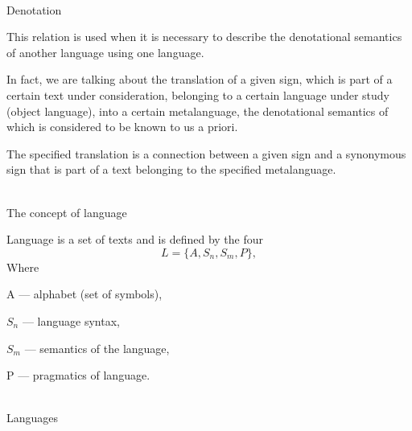 \begin{frame}{\\Denotation}
	\topline
	\justifying
	\small
	
	This relation is used when it is necessary to describe the denotational semantics of another language using one language.
	
	\bigskip
	
	In fact, we are talking about the translation of a given sign, which is part of a certain text under consideration, belonging to a certain language under study (object language), into a certain metalanguage, the denotational semantics of which is considered to be known to us a priori.
	
	\bigskip
	
	The specified translation is a connection between a given sign and a synonymous sign that is part of a text belonging to the specified metalanguage.
	
\end{frame}

\begin{frame}{\\The concept of language}
	\topline
	\justifying
	
	Language is a set of texts and is defined by the four
	\[
	L = \{ A, S_n, S_m, P \},
	\]
	Where
	
	A --- alphabet (set of symbols),
	
	$S_n$ --- language syntax,
	
	$S_m$ --- semantics of the language,
	
	P --- pragmatics of language.
	
\end{frame}

\begin{frame}{\\Languages}
	\topline
	\justifying
	
	\begin{SCn}
		\begin{scnindent}
		\end{scnindent}
	\end{SCn}
	
\end{frame}

